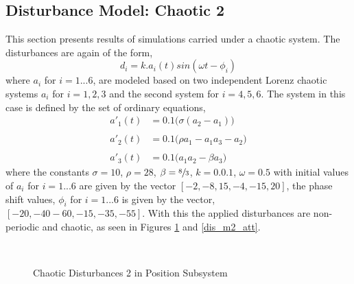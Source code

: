 \documentclass[letterpaper%
, twoside%
, 12pt%
,memoire%
, english%
,creativecommons,hyperref%
]{thETS}
\begin{document}
\subsection{Disturbance Model: Chaotic 2}
This section presents results of simulations carried under a chaotic system. The disturbances are again of the form,
\begin{equation}
d_i = k.a_i(t)sin(\omega t-\phi_i)
\label{eq:dist_2}
\end{equation}
where $a_i$ for $i=1...6$, are modeled based on two independent Lorenz chaotic systems $a_i$ for $i=1,2,3$ and the second system for $i=4,5,6$. The system in this case is defined by the set of ordinary equations, 
\begin{subequations}
\begin{align}
a'_1(t) &= 0.1\big(\sigma(a_2-a_1)\big)\\ \nonumber\\
a'_2(t) &= 0.1\big(\rho a_1 - a_1 a_3 - a_2\big)\\ \nonumber \\
a'_3(t) &= 0.1\big(a_1 a_2 - \beta a_3\big)
\end{align}
\end{subequations}
where the constants $\sigma=10$, $\rho=28$, $\beta=\sfrac{8}{3}$, $k=0.0.1$, $\omega=0.5$ with initial values of $a_i$ for $i=1...6$ are given by the vector $[-2,-8,15,-4,-15,20]$, the phase shift values, $\phi_i$ for $i=1...6$ is given by the vector, $[-20,-40-60,-15,-35,-55]$. With this the applied disturbances are non-periodic and chaotic, as seen in Figures \ref{dis_m2_pos} and \ref{dis_m2_att}.

\begin{figure}[H]
\centering
{}
\\ \parbox{0.75\textwidth}{\caption{Chaotic Disturbances 2 in Position Subsystem} \label{dis_m2_pos}}
\end{figure}
\end{document}
